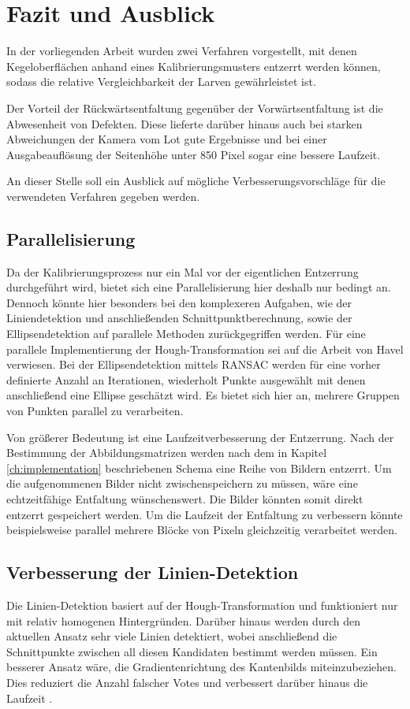 \chapter{Fazit und Ausblick}
\label{ch:summary}
In der vorliegenden Arbeit wurden zwei Verfahren vorgestellt, mit denen Kegeloberflächen anhand eines Kalibrierungsmusters entzerrt werden können, sodass die relative Vergleichbarkeit der Larven gewährleistet ist.

Der Vorteil der Rückwärtsentfaltung gegenüber der Vorwärtsentfaltung ist die Abwesenheit von Defekten. Diese lieferte darüber hinaus auch bei starken Abweichungen der Kamera vom Lot gute Ergebnisse und bei einer Ausgabeauflösung der Seitenhöhe unter 850 Pixel sogar eine bessere Laufzeit.

An dieser Stelle soll ein Ausblick auf mögliche Verbesserungsvorschläge für die verwendeten Verfahren gegeben werden.

\section{Parallelisierung}
Da der Kalibrierungsprozess nur ein Mal vor der eigentlichen Entzerrung durchgeführt wird, bietet sich eine Parallelisierung hier deshalb nur bedingt an.
Dennoch könnte hier besonders bei den komplexeren Aufgaben, wie der Liniendetektion und anschließenden Schnittpunktberechnung, sowie der Ellipsendetektion auf parallele Methoden zurückgegriffen werden.
Für eine parallele Implementierung der Hough-Transformation sei auf die Arbeit von Havel \cite{Havel2014} verwiesen.
Bei der Ellipsendetektion mittels RANSAC werden für eine vorher definierte Anzahl an Iterationen, wiederholt Punkte ausgewählt mit denen anschließend eine Ellipse geschätzt wird. Es bietet sich hier an, mehrere Gruppen von Punkten parallel zu verarbeiten.

Von größerer Bedeutung ist eine Laufzeitverbesserung der Entzerrung. Nach der Bestimmung der Abbildungsmatrizen werden nach dem in Kapitel \ref{ch:implementation} beschriebenen Schema eine Reihe von Bildern entzerrt. Um die aufgenommenen Bilder nicht zwischenspeichern zu müssen, wäre eine echtzeitfähige Entfaltung wünschenswert. Die Bilder könnten somit direkt entzerrt gespeichert werden.  Um die Laufzeit der Entfaltung zu verbessern könnte beispielsweise parallel mehrere Blöcke von Pixeln gleichzeitig verarbeitet werden.


\section{Verbesserung der Linien-Detektion}
Die Linien-Detektion basiert auf der Hough-Transformation und funktioniert nur mit relativ homogenen Hintergründen. Darüber hinaus werden durch den aktuellen Ansatz sehr viele Linien detektiert, wobei anschließend die Schnittpunkte zwischen all diesen Kandidaten bestimmt werden müssen. Ein besserer Ansatz wäre, die Gradientenrichtung des Kantenbilds miteinzubeziehen. Dies reduziert die Anzahl falscher Votes und verbessert darüber hinaus die Laufzeit \cite{Gorman1976}.


